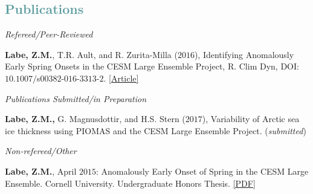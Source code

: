 \documentclass[margin,line,palatino,courier,10pt]{res}
\begin{document}
\begin{resume}
\section{\sc \large{\textcolor{CadetBlue}{Publications}}}
\textit{Refereed/Peer-Reviewed}
\vspace*{-0.1in}\\
\begin{etaremune}[leftmargin=0in,topsep=0in,parsep=0in]
\item \textbf{Labe, Z.M.}, T.R. Ault, and R. Zurita-Milla ($2016$), Identifying Anomalously Early Spring Onsets in the CESM Large Ensemble Project, R. Clim Dyn, DOI:$10.1007/$s$00382$-$016$-$3313$-$2$. \href{http://link.springer.com/article/10.1007/s00382-016-3313-2}{[Article]}
\end{etaremune}

\textit{Publications Submitted/in Preparation}
\vspace*{-0.1in}\\
\begin{etaremune}[leftmargin=0in,topsep=0in,parsep=0in]
\item \textbf{Labe, Z.M.,} G. Magnusdottir, and H.S. Stern ($2017$), Variability of Arctic sea ice thickness using PIOMAS and the CESM Large Ensemble Project. (\textit{submitted})
\end{etaremune}

\textit{Non-refereed/Other}
\vspace*{-0.1in}\\
\begin{etaremune}[leftmargin=0in,topsep=0in,parsep=0in]
\item \textbf{Labe, Z.M.}, April $2015$: Anomalously Early Onset of Spring in the CESM Large Ensemble. Cornell University. Undergraduate Honors Thesis. \href{http://sites.uci.edu/zlabe/files/2015/11/Labe_Thesis2015.pdf}{[PDF]}
\end{etaremune}


\end{resume}
\end{document}
